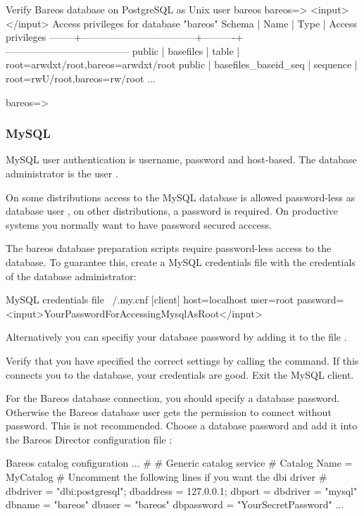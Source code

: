 \begin{commands}{Verify Bareos database on PostgreSQL as Unix user bareos}
bareos=> <input>\dp</input>
                 Access privileges for database "bareos"
 Schema |               Name                |   Type   |  Access privileges
--------+-----------------------------------+----------+--------------------------------------
 public | basefiles                         | table    | {root=arwdxt/root,bareos=arwdxt/root}
 public | basefiles_baseid_seq              | sequence | {root=rwU/root,bareos=rw/root}
...

bareos=>
\end{commands}


\subsubsection{MySQL}
    \label{catalog-maintenance-mysql}

MySQL user authentication is username, password and host-based.
The database administrator is the user .

On some distributions access to the MySQL database is allowed password-less as database user ,
on other distributions, a password is required.
On productive systems you normally want to have password secured acccess.

The bareos database preparation scripts require password-less access to the database.
To guarantee this, create a MySQL credentials file  with the credentials of the database administrator:
\begin{config}{MySQL credentials file ~/.my.cnf}
[client]
host=localhost
user=root
password=<input>YourPasswordForAccessingMysqlAsRoot</input>
\end{config}
Alternatively you can specifiy your database password by adding it to the file .

Verify that you have specified the correct settings by calling the  command.
If this connects you to the database, your credentials are good.
Exit the MySQL client.

For the Bareos database connection, you should specify a database password. 
Otherwise the Bareos database user gets the permission to connect without password.
This is not recommended.
Choose a database password and add it into the Bareos Director configuration file \configFileDirUnix:
\begin{bconfig}{Bareos catalog configuration}
...
#
# Generic catalog service
#
Catalog {
  Name = MyCatalog
  # Uncomment the following lines if you want the dbi driver
  # dbdriver = "dbi:postgresql"; dbaddress = 127.0.0.1; dbport =  
  dbdriver = "mysql"
  dbname = "bareos"
  dbuser = "bareos"
  dbpassword = "YourSecretPassword"
}
...
\end{bconfig}

